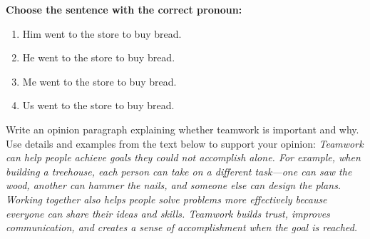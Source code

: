 \documentclass[12pt]{article}
\begin{document}
\begin{tcolorbox}[colframe=black!50, colback=white, title=Question 9]
\textbf{Choose the sentence with the correct pronoun:}  
\begin{enumerate}[label=(\Alph*)]
\item Him went to the store to buy bread.  
\item He went to the store to buy bread.  
\item Me went to the store to buy bread.  
\item Us went to the store to buy bread.  
\end{enumerate}
\end{tcolorbox}

\begin{tcolorbox}[colframe=black!50, colback=white, title=Question 10: Writing Performance Task]
Write an opinion paragraph explaining whether teamwork is important and why. Use details and examples from the text below to support your opinion:  
\textit{Teamwork can help people achieve goals they could not accomplish alone. For example, when building a treehouse, each person can take on a different task—one can saw the wood, another can hammer the nails, and someone else can design the plans. Working together also helps people solve problems more effectively because everyone can share their ideas and skills. Teamwork builds trust, improves communication, and creates a sense of accomplishment when the goal is reached.}

\vspace{2em}
 \underline{\hspace{15.8cm}}  
    \\[0.8cm] \underline{\hspace{15.8cm}}  
    \\[0.8cm] \underline{\hspace{15.8cm}}  
    \\[0.8cm] \underline{\hspace{15.8cm}} 
     \\[0.8cm] \underline{\hspace{15.8cm}}  
    \\[0.8cm] \underline{\hspace{15.8cm}}  
    \\[0.8cm] \underline{\hspace{15.8cm}}  
     \\[0.8cm] \underline{\hspace{15.8cm}}  
    \\[0.8cm] \underline{\hspace{15.8cm}}  
\end{tcolorbox}
\end{document}
